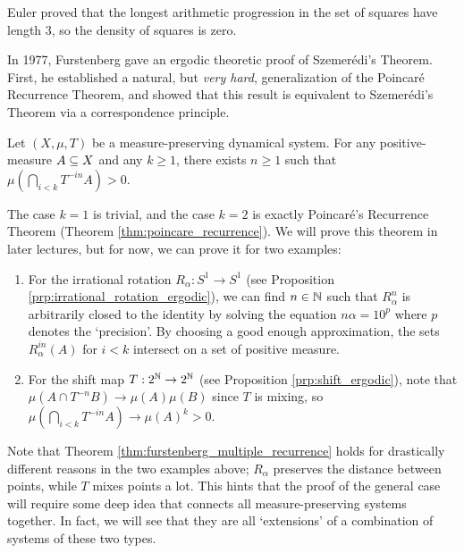\documentclass[reqno, twoside]{article}
\begin{document}
    \begin{remark}
        Euler proved that the longest arithmetic progression in the set of squares have length $3$, so the density of squares is zero.
    \end{remark}

    In 1977, Furstenberg \cite{Fur77} gave an ergodic theoretic proof of Szemerédi's Theorem. First, he established a natural, but \textit{very hard}, generalization of the Poincaré Recurrence Theorem, and showed that this result is equivalent to Szemerédi's Theorem via a correspondence principle.

    \begin{theorem}\label{thm:furstenberg_multiple_recurrence}
        Let $(X,\mu,T)$ be a measure-preserving dynamical system. For any positive-measure $A\subseteq X$ and any $k\geq1$, there exists $n\geq1$ such that $\mu(\bigcap_{i<k}T^{-in}A)>0$.
    \end{theorem}

    The case $k=1$ is trivial, and the case $k=2$ is exactly Poincaré's Recurrence Theorem (Theorem \ref{thm:poincare_recurrence}). We will prove this theorem in later lectures, but for now, we can prove it for two examples:
    \begin{enumerate}
        \item For the irrational rotation $R_\alpha:S^1\to S^1$ (see Proposition \ref{prp:irrational_rotation_ergodic}), we can find $n\in\mathbb{N}$ such that $R_\alpha^n$ is arbitrarily closed to the identity by solving the equation $n\alpha=10^p$ where $p$ denotes the `precision'. By choosing a good enough approximation, the sets $R_\alpha^{in}(A)$ for $i<k$ intersect on a set of positive measure.
            \vspace{-0.22in}
        \item For the shift map $T:2^{\mathbb{N}}\to2^{\mathbb{N}}$ (see Proposition \ref{prp:shift_ergodic}), note that $\mu(A\cap T^{-n}B)\to\mu(A)\mu(B)$ since $T$ is mixing, so $\mu(\bigcap_{i<k}T^{-in}A)\to\mu(A)^k>0$.
    \end{enumerate}
    Note that Theorem \ref{thm:furstenberg_multiple_recurrence} holds for drastically different reasons in the two examples above; $R_\alpha$ preserves the distance between points, while $T$ mixes points a lot. This hints that the proof of the general case will require some deep idea that connects all measure-preserving systems together. In fact, we will see that they are all `extensions' of a combination of systems of these two types.
\end{document}
